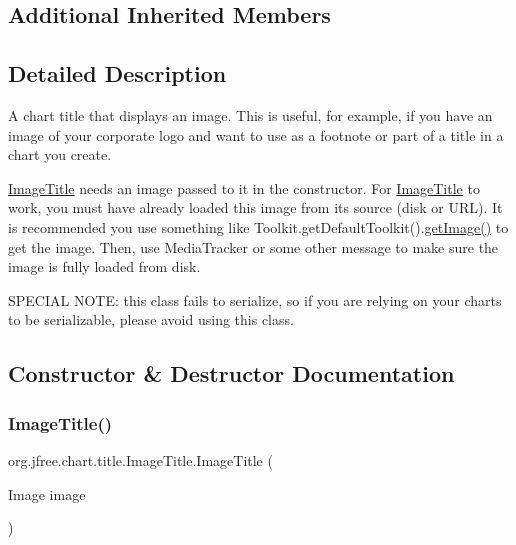 \subsection*{Additional Inherited Members}


\subsection{Detailed Description}
A chart title that displays an image. This is useful, for example, if you have an image of your corporate logo and want to use as a footnote or part of a title in a chart you create. 

\mbox{\hyperlink{classorg_1_1jfree_1_1chart_1_1title_1_1_image_title}{Image\+Title}} needs an image passed to it in the constructor. For \mbox{\hyperlink{classorg_1_1jfree_1_1chart_1_1title_1_1_image_title}{Image\+Title}} to work, you must have already loaded this image from its source (disk or U\+RL). It is recommended you use something like Toolkit.\+get\+Default\+Toolkit().\mbox{\hyperlink{classorg_1_1jfree_1_1chart_1_1title_1_1_image_title_ac14ca8152629076360eb04f0f93eb2ba}{get\+Image()}} to get the image. Then, use Media\+Tracker or some other message to make sure the image is fully loaded from disk. 

S\+P\+E\+C\+I\+AL N\+O\+TE\+: this class fails to serialize, so if you are relying on your charts to be serializable, please avoid using this class. 

\subsection{Constructor \& Destructor Documentation}
\mbox{\label{classorg_1_1jfree_1_1chart_1_1title_1_1_image_title_a24e3d2cf74bb93acae77375d4b741351}} 
\subsubsection{\texorpdfstring{Image\+Title()}{ImageTitle()}\hspace{0.1cm}{\footnotesize\ttfamily [1/3]}}
{\footnotesize\ttfamily org.\+jfree.\+chart.\+title.\+Image\+Title.\+Image\+Title (\begin{DoxyParamCaption}\item[{Image}]{image }\end{DoxyParamCaption})}


